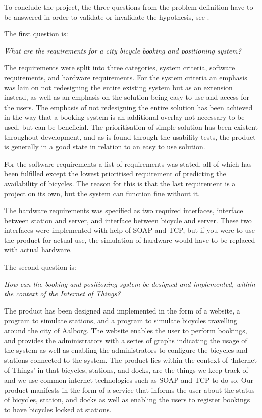 To conclude the project, the three questions from the problem definition have to be answered in order to validate or invalidate the hypothesis, see .

The first question is:
\begin{center}
	\textit{What are the requirements for a city bicycle booking and positioning system?}
\end{center}
The requirements were split into three categories, system criteria, software requirements, and hardware requirements.
For the system criteria an emphasis was lain on not redesigning the entire existing system but as an extension instead, as well as an emphasis on the solution being easy to use and access for the users.
The emphasis of not redesigning the entire solution has been achieved in the way that a booking system is an additional overlay not necessary to be used, but can be beneficial.
The prioritisation of simple solution has been existent throughout development, and as is found through the usability tests, the product is generally in a good state in relation to an easy to use solution.

For the software requirements a list of requirements was stated, all of which has been fulfilled except the lowest prioritised requirement of predicting the availability of bicycles. The reason for this is that the last requirement is a project on its own, but the system can function fine without it.

The hardware requirements was specified as two required interfaces, interface between station and server, and interface between bicycle and server.
These two interfaces were implemented with help of SOAP and TCP, but if you were to use the product for actual use, the simulation of hardware would have to be replaced with actual hardware.

The second question is:
\begin{center}
	\textit{How can the booking and positioning system be designed and implemented, within the context of the Internet of Things?}
\end{center}
The product has been designed and implemented in the form of a website, a program to simulate stations, and a program to simulate bicycles travelling around the city of Aalborg.
The website enables the user to perform bookings, and provides the administrators with a series of graphs indicating the usage of the system as well as enabling the administrators to configure the bicycles and stations connected to the system.
The product lies within the context of `Internet of Things' in that bicycles, stations, and docks, are the things we keep track of and we use common internet technologies such as SOAP and TCP to do so. Our product manifests in the form of a service that informs the user about the status of bicycles, station, and docks as well as enabling the users to register bookings to have bicycles locked at stations.

